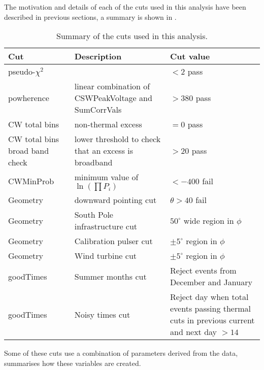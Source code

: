 The motivation and details of each of the cuts used in this analysis have been described in previous sections, a summary is shown in .

\begin{table}
\begin{center}
  \begin{tabular}{ p{} p{} p{} }
    \textbf{Cut}  & \textbf{Description} & \textbf{Cut value} \\    
    \hline
    pseudo-$\chi^{2}$ & & $< 2$ pass\\
    powherence & linear combination of CSWPeakVoltage and SumCorrVals & $> 380$ pass\\
    CW total bins & non-thermal excess & $=0$ pass\\
    CW total bins broad band check & lower threshold to check that an excess is broadband & $> 20$ pass\\
    CWMinProb & minimum value of $\ln(\prod P_{i})$ & $< -400$ fail\\
    Geometry & downward pointing cut & $\theta > 40$ fail\\
    Geometry & South Pole infrastructure cut & $50^{\circ}$ wide region in $\phi$\\
    Geometry & Calibration pulser cut & $\pm 5^{\circ}$ region in $\phi$\\
    Geometry & Wind turbine cut & $\pm 5^{\circ}$ region in $\phi$\\
    goodTimes & Summer months cut & Reject events from December and January\\
    goodTimes & Noisy times cut & Reject day when total events passing thermal cuts in previous current and next day $> 14$\\
  \end{tabular}
  \caption{Summary of the cuts used in this analysis.}
  \label{tab:Analysis:Cut-Summary}
\end{center}
\end{table}

Some of these cuts use a combination of parameters derived from the data,  summarises how these variables are created.

